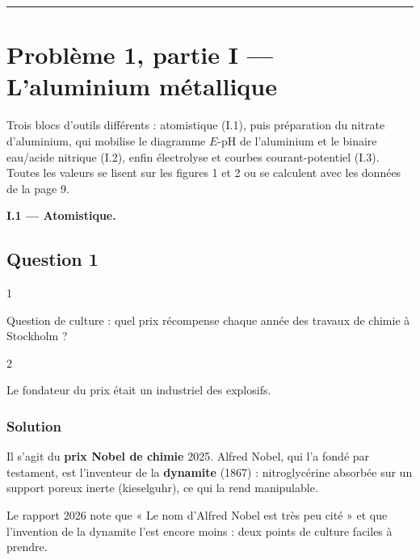 \documentclass[11pt,a4paper]{article}
\begin{document}
\begin{center}\rule{0.5\linewidth}{0.5pt}\end{center}

\hypertarget{probluxe8me-1-partie-i-laluminium-muxe9tallique}{%
\section{Problème 1, partie I --- L'aluminium métallique}\label{probluxe8me-1-partie-i-laluminium-muxe9tallique}}

Trois blocs d'outils différents : atomistique (I.1), puis préparation du nitrate d'aluminium, qui mobilise le diagramme \(E\)-pH de l'aluminium et le binaire eau/acide nitrique (I.2), enfin électrolyse et courbes courant-potentiel (I.3). Toutes les valeurs se lisent sur les figures 1 et 2 ou se calculent avec les données de la page 9.

\textbf{I.1 --- Atomistique.}

\hypertarget{question-1}{%
\subsection{Question 1}\label{question-1}}

\begin{indication}{1}

Question de culture : quel prix récompense chaque année des travaux de chimie à Stockholm ?

\end{indication}

\begin{indication}{2}

Le fondateur du prix était un industriel des explosifs.

\end{indication}

\hypertarget{solution}{%
\subsubsection{Solution}\label{solution}}

Il s'agit du \textbf{prix Nobel de chimie} 2025. Alfred Nobel, qui l'a fondé par testament, est l'inventeur de la \textbf{dynamite} (1867) : nitroglycérine absorbée sur un support poreux inerte (kieselguhr), ce qui la rend manipulable.

\begin{jury}

Le rapport 2026 note que « Le nom d'Alfred Nobel est très peu cité » et que l'invention de la dynamite l'est encore moins : deux points de culture faciles à prendre.

\end{jury}
\end{document}
